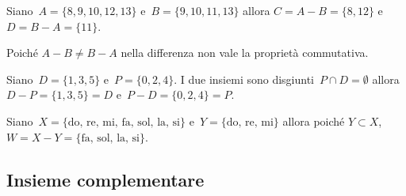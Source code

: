  \begin{esempio}
Siano~\(A=\{8, 9, 10, 12, 13\}\) e~\(B=\{9, 10, 11, 13\}\) allora
\(C=A-B=\{8, 12\}\) e~\(D=B-A=\{11\}\).
\begin{center}
 
\end{center}
 \end{esempio}

Poiché \(A-B\neq B-A\) nella differenza non vale la proprietà
commutativa.

 \begin{esempio}
Siano~\(D=\{1, 3, 5\}\) e~\(P=\{0, 2, 4\}\). I due insiemi sono 
disgiunti~\(P\cap D=\emptyset\) 
allora~\(D-P=\{1,3,5\}=D\) e~\(P-D=\{0,2,4\}=P\).
 \end{esempio}

 \begin{esempio}
Siano~\(X=\{\text{do, re, mi, fa, sol, la, si}\}\)
e~\(Y=\{\text{do, re, mi}\}\) allora poiché
\(Y\subset X\), \(W=X-Y=\{\text{fa, sol, la, si}\}\).
\begin{center}
 
\end{center}
 \end{esempio}


\subsection{Insieme complementare}
\label{subsec:op_complementare}

